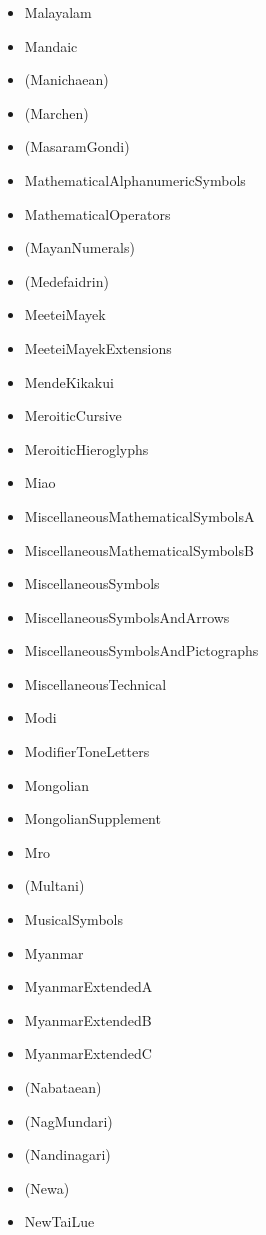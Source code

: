 \documentclass{article}
\newenvironment{itemlist}{%
  \begin{itemize}
  \setlength{\itemsep}{0pt}
  \setlength{\parsep}{0pt}
  \setlength{\topsep}{0pt}
  \setlength{\partopsep}{0pt}
  \setlength{\parskip}{0pt}
  \setlength{\labelsep}{5pt}}%
{
  \end{itemize}}
\begin{document}
\begin{multicols*}{2}
\begin{itemlist}
        \item Malayalam
        \item Mandaic
        \item (Manichaean)
        \item (Marchen)
        \item (MasaramGondi)
        \item MathematicalAlphanumericSymbols
        \item MathematicalOperators
        \item (MayanNumerals)
        \item (Medefaidrin)
        \item MeeteiMayek
        \item MeeteiMayekExtensions
        \item MendeKikakui
        \item MeroiticCursive
        \item MeroiticHieroglyphs
        \item Miao
        \item MiscellaneousMathematicalSymbolsA
        \item MiscellaneousMathematicalSymbolsB
        \item MiscellaneousSymbols
        \item MiscellaneousSymbolsAndArrows
        \item MiscellaneousSymbolsAndPictographs
        \item MiscellaneousTechnical
        \item Modi
        \item ModifierToneLetters
        \item Mongolian
        \item MongolianSupplement
        \item Mro
        \item (Multani)
        \item MusicalSymbols
        \item Myanmar
        \item MyanmarExtendedA
        \item MyanmarExtendedB
        \item MyanmarExtendedC
        \item (Nabataean)
        \item (NagMundari)
        \item (Nandinagari)
        \item (Newa)
        \item NewTaiLue

\end{itemlist}
\end{multicols*}
\end{document}
